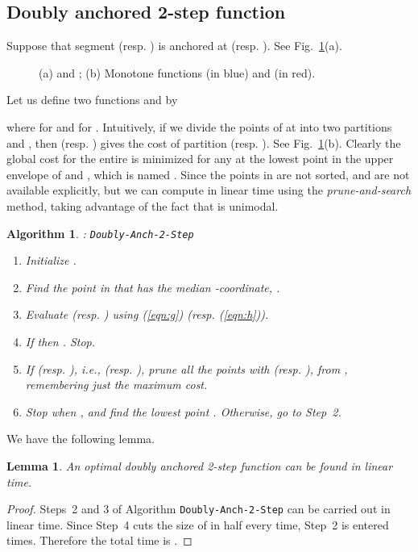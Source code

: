 \documentclass[preprint,10pt]{elsarticle}
\newtheorem{lemma}{Lemma}
\newtheorem{algorithm}{Algorithm}
\begin{document}
\subsection{Doubly anchored 2-step function}
Suppose that segment  (resp. ) is anchored at  (resp. ).
See Fig.~\ref{fig:anchored2}(a).
\begin{figure}[ht]
\centering
{}
\hspace{4mm}
\caption{(a)  and ;
(b) Monotone functions  (in blue) and  (in red).
}
\label{fig:anchored2}
\end{figure}
Let us define two functions  and  by

where  for  and  for .
Intuitively, if we divide the points of  at  into two partitions  and ,
then  (resp. ) gives the cost of partition  (resp. ).
See Fig.~\ref{fig:anchored2}(b).
Clearly the global cost for the entire  is minimized for any 
at the lowest point in the upper envelope of  and ,
which is named .
Since the points in  are not sorted,
 and  are not available explicitly,
but we can compute  in linear time using the {\em prune-and-search} method,
taking advantage of the fact that  is unimodal.

\begin{algorithm}{\rm :} {\tt Doubly-Anch-2-Step}\label{alg:double}
\begin{enumerate}
\item
Initialize .
\item
Find the point in  that has the median -coordinate, .
\item
Evaluate  (resp. ) using (\ref{eqn:g}) (resp. (\ref{eqn:h})).
\item
If  then . Stop.
\item
If  (resp. ), 
i.e.,  (resp. ),
prune all the points  with  (resp. ),
 from ,
remembering just the maximum cost.
\item
Stop when , and find the lowest point .
Otherwise, go to Step~2.
\end{enumerate}
\end{algorithm}

We have the following lemma.
\begin{lemma}\label{lem:doublyAnchored}
An optimal doubly anchored 2-step function
can be found in linear time.
\end{lemma}
\begin{proof}
Steps~2 and 3 of Algorithm {\tt Doubly-Anch-2-Step} can be carried out in linear time.
Since Step~4 cuts the size of  in half every time, Step~2 is entered  times.
Therefore the total time is .
\end{proof}
\end{document}
